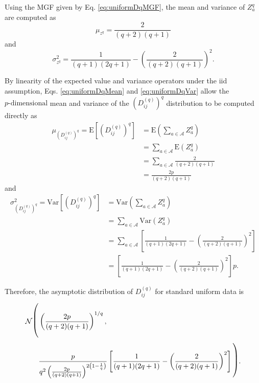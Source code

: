 \documentclass[10pt,letterpaper]{article}\usepackage[]{graphicx}\usepackage[]{color}
\begin{document}
Using the MGF given by Eq. \ref{eq:uniformDqMGF}, the mean and variance of $Z^q_a$ are computed as
%
\begin{equation}\label{eq:1DuniformDqMean}
\mu_{z^q} = \frac{2}{(q + 2)(q + 1)}
\end{equation}
%
and
%
\begin{equation}\label{eq:1DuniformDqVar}
\sigma^2_{z^q} = \frac{1}{(q + 1)(2q + 1)} - \left(\frac{2}{(q + 2)(q + 1)}\right)^2.
\end{equation}

By linearity of the expected value and variance operators under the iid assumption, Eqs. \ref{eq:uniformDqMean} and \ref{eq:uniformDqVar} allow the $p \text{-dimensional}$ mean and variance of the $\left(D^{(q)}_{ij}\right)^q$ distribution to be computed directly as
%
\begin{equation}\label{eq:uniformDqMean}
\begin{split}
\mu_{\left(D^{(q)}_{ij}\right)^q} = \text{E}\left[\left(D^{(q)}_{ij}\right)^q\right] &= \text{E}\left(\sum_{a \in \mathcal{A}}Z^q_a\right) \\
&= \sum_{a \in \mathcal{A}} \text{E}(Z^q_a) \\
&= \sum_{a \in \mathcal{A}} \frac{2}{(q + 2)(q + 1)} \\
&= \frac{2p}{(q + 2)(q + 1)}
\end{split}
\end{equation}
%
and
%
\begin{equation}\label{eq:uniformDqVar}
\begin{split}
\sigma^2_{\left(D^{(q)}_{ij}\right)^q} = \text{Var}\left[\left(D^{(q)}_{ij}\right)^q\right] &= \text{Var}\left(\sum_{a \in \mathcal{A}} Z^q_a\right) \\
&= \sum_{a \in \mathcal{A}} \text{Var}\left(Z^q_a\right) \\
&= \sum_{a \in \mathcal{A}} \left[\frac{1}{(q + 1)(2q + 1)} - \left(\frac{2}{(q + 2)(q + 1)}\right)^2\right] \\
&= \left[\frac{1}{(q + 1)(2q + 1)} - \left(\frac{2}{(q + 2)(q + 1)}\right)^2\right]p.
\end{split}
\end{equation}

Therefore, the asymptotic distribution of $D^{(q)}_{ij}$ for standard uniform data is
%
\begin{equation}\label{eq:uniformDistr}
\begin{split}
\mathcal{N}{\text{\LARGE $\Biggl($}}& \left(\frac{2p}{(q + 2)(q + 1)}\right)^{1/q}, \\
& \frac{p}{q^2\left(\frac{2p}{(q + 2)(q + 1)}\right)^{2\left(1 - \frac{1}{q}\right)}}\left[\frac{1}{(q + 1)(2q + 1)} - \left(\frac{2}{(q + 2)(q + 1)}\right)^2\right]{\text{\LARGE $\Biggr)$}}.
\end{split}
\end{equation}
\end{document}
